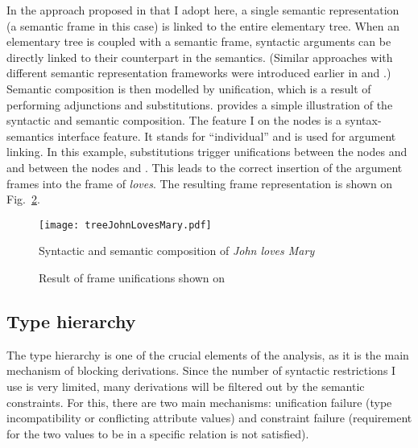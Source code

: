 In the approach proposed in \cite{KallmeyerOsswald:13} that I adopt here, a single semantic representation (a semantic frame in this case) is linked to the entire elementary tree. When an elementary tree is coupled with a semantic frame, syntactic arguments can be directly linked to their counterpart in the semantics. (Similar approaches with different semantic representation frameworks were introduced earlier in \cite{GardentKallmeyer:03} and \cite{KallmeyerRomero:08}.) Semantic composition is then modelled by unification, which is a result of performing adjunctions and substitutions.  provides a simple illustration of the syntactic and semantic composition. The feature I on the nodes is a syntax-semantics interface feature. It stands for ``individual'' and is used for argument linking. In this example, substitutions trigger unifications between the nodes  and  and  between the nodes  and . This leads to the correct insertion of the argument frames into the frame of \textit{loves}. The resulting frame representation is shown on Fig.~\ref{frame:love}.
\begin{figure}
	\centering
    \texttt{[image: treeJohnLovesMary.pdf]} 
    \caption{Syntactic and semantic composition of \textit{John loves Mary}}      
    \label{fig:examplesemantic}
\end{figure}

\begin{figure}
\caption{Result of frame unifications shown on  \label{frame:love}}
\end{figure}


\subsection{Type hierarchy}\label{section:types}
The type hierarchy is one of the crucial elements of the analysis, as it is the main mechanism of blocking derivations. Since the number of syntactic restrictions I use is very limited, many derivations will be filtered out by the semantic constraints. For this, there are two main mechanisms: unification failure (type incompatibility or conflicting attribute values) and constraint failure (requirement for the two values to be in a specific relation is not satisfied). 

